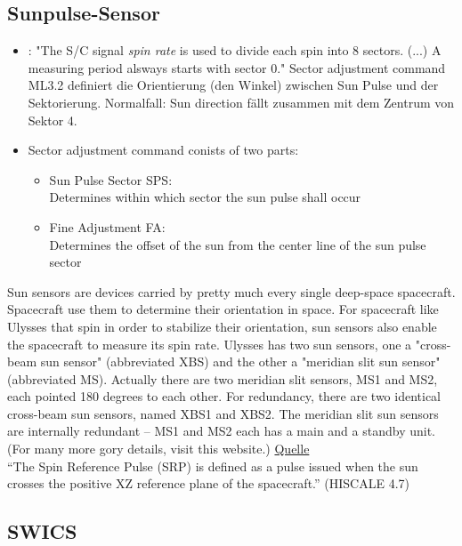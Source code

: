 \documentclass[]{article}
\begin{document}
	\subsection{Sunpulse-Sensor}
	\begin{itemize}
		\item \cite{swics_dpu}: "The S/C signal \textit{spin rate} is used to divide each spin into 8 sectors. (...) A measuring period alsways starts with sector 0." Sector adjustment command ML3.2 definiert die Orientierung (den Winkel) zwischen Sun Pulse und der Sektorierung. Normalfall: Sun direction fällt zusammen mit dem Zentrum von Sektor 4. 
		\item Sector adjustment command conists of two parts:
		\begin{itemize}
			\item Sun Pulse Sector SPS: \\ Determines within which sector the sun pulse shall occur
			\item Fine Adjustment FA: \\ Determines the offset of the sun from the center line of the sun pulse sector
		\end{itemize}
	\end{itemize}
	Sun sensors are devices carried by pretty much every single deep-space spacecraft. Spacecraft use them to determine their orientation in space. For spacecraft like Ulysses that spin in order to stabilize their orientation, sun sensors also enable the spacecraft to measure its spin rate. Ulysses has two sun sensors, one a "cross-beam sun sensor" (abbreviated XBS) and the other a "meridian slit sun sensor" (abbreviated MS). Actually there are two meridian slit sensors, MS1 and MS2, each pointed 180 degrees to each other. For redundancy, there are two identical cross-beam sun sensors, named XBS1 and XBS2. The meridian slit sun sensors are internally redundant -- MS1 and MS2 each has a main and a standby unit. (For many more gory details, visit this website.)
	\href{http://www.planetary.org/blogs/emily-lakdawalla/2008/1661.html}{Quelle}\\[0.6cm]
	"`The Spin Reference Pulse (SRP) is defined as a pulse issued when the sun crosses the positive XZ reference plane of the spacecraft."' (HISCALE 4.7)
\subsection{SWICS}
\end{document}
